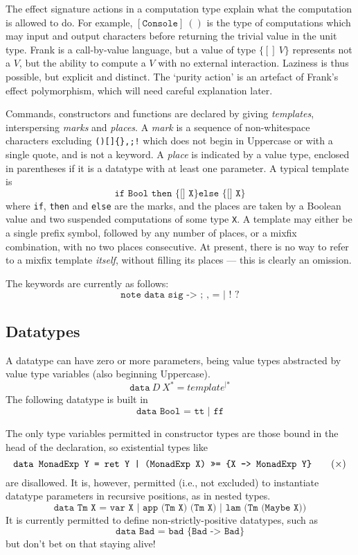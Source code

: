\documentclass{article}
\begin{document}
The effect signature actions in a computation type explain what the
computation is allowed to do. For example, \([\texttt{Console}]\:()\)
is the type of computations which may input and output characters
before returning the trivial value in the unit type. Frank is a
call-by-value language, but a value of type \(\{[]\:V\}\) represents
not a \(V\), but the ability to compute a \(V\) with no external
interaction. Laziness is thus possible, but explicit and distinct. The
`purity action' is an artefact of Frank's effect polymorphism, which
will need careful explanation later.

Commands, constructors and functions are declared by giving \emph{templates}, interspersing \emph{marks} and \emph{places}. A \emph{mark} is a sequence of non-whitespace characters excluding \texttt{()[]\{\},;!} which does not begin in Uppercase or with a single quote, and is not a keyword. A \emph{place} is indicated by a value type, enclosed in parentheses if it is a datatype with at least one parameter.
A typical template is
\[
  \texttt{if Bool then \{[] X\} else \{[] X\}}
\]
where \texttt{if}, \texttt{then} and \texttt{else} are the marks, and the
places are taken by a Boolean value and two suspended computations of some type \texttt{X}. A template may either be a single prefix symbol, followed by any number of places, or a mixfix combination, with no two places consecutive. At present, there is no way to refer to a mixfix template \emph{itself}, without filling its places --- this is clearly an omission.

The keywords are currently as follows:
\[
\texttt{note data sig -> ; , = | ! ?}
\]




\subsection{Datatypes}

A datatype can have zero or more parameters, being value types abstracted by value type variables (also beginning Uppercase).
\[
\texttt{data}\:D\:X^\ast\;\texttt{=}\;\mathit{template}^{|\ast}
\]
The following datatype is built in
\[
\texttt{data Bool  =  tt  |  ff}
\]

The only type variables permitted in constructor types are those bound in the head of the declaration, so existential types like
\[
  \texttt{data MonadExp Y  =  ret Y  |  (MonadExp X) >>= \{X -> MonadExp Y\}}\qquad\hfill (\times)
\]
are disallowed. It is, however, permitted (i.e., not excluded) to instantiate datatype parameters in recursive positions, as in nested types.
\[
  \texttt{data Tm X = var X | app (Tm X) (Tm X) | lam (Tm (Maybe X))}
\]
It is currently permitted to define non-strictly-positive datatypes, such as
\[
  \texttt{data Bad = bad \{Bad -> Bad\}}
\]
but don't bet on that staying alive!
\end{document}
